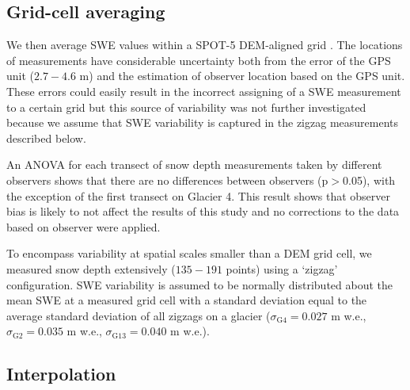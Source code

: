 \documentclass[twocolumn,letterpaper]{igs}
\begin{document}
\subsection{Grid-cell averaging}

We then average SWE values within a SPOT-5 DEM-aligned grid \citep{Korona2009}. The locations of measurements have considerable uncertainty both from the error of the GPS unit ($2.7 - 4.6$ m) and the estimation of observer location based on the GPS unit. These errors could easily result in the incorrect assigning of a SWE measurement to a certain grid but this source of variability was not further investigated because we assume that SWE variability is captured in the zigzag measurements described below. 

An ANOVA for each transect of snow depth measurements taken by different observers
shows that there are no differences between observers (p$>$0.05), with the exception of the first transect on Glacier 4. This result shows that observer bias is likely to not affect the results of this study and no corrections to the data based on observer were applied.

To encompass variability at spatial scales smaller than a DEM grid cell, we measured snow depth extensively ($135-191$ points) using a `zigzag' configuration. SWE variability is assumed to be normally distributed about the mean SWE at a measured grid cell with a standard deviation equal to the average standard deviation of all zigzags on a glacier ($\sigma_{\mathrm{G4}} =  0.027$ m w.e., $\sigma_{\mathrm{G2}} =  0.035$ m w.e., $\sigma_{\mathrm{G13}} =  0.040$ m w.e.).

\subsection{Interpolation}
\end{document}
